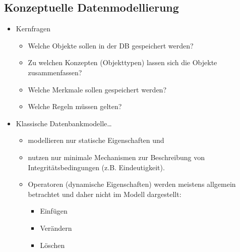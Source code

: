 \documentclass[a4paper, 11pt, accentcolor = tud3b]{tudreport}
\begin{document}
            \subsection{Konzeptuelle Datenmodellierung} %
                \begin{itemize}
                	\item Kernfragen
                		\begin{itemize}
                			\item Welche Objekte sollen in der DB gespeichert werden?
                			\item Zu welchen Konzepten (Objekttypen) lassen sich die Objekte zusammenfassen?
                			\item Welche Merkmale sollen gespeichert werden?
                			\item Welche Regeln müssen gelten?
                		\end{itemize}
                	\item Klassische Datenbankmodelle\dots
                		\begin{itemize}
                			\item modellieren nur statische Eigenschaften und
                			\item nutzen nur minimale Mechanismen zur Beschreibung von Integritätsbedingungen (z.B. Eindeutigkeit).
                			\item Operatoren (dynamische Eigenschaften) werden meistens allgemein betrachtet und daher nicht im Modell dargestellt:
                				\begin{itemize}
                					\item Einfügen
                					\item Verändern
                					\item Löschen
                				\end{itemize}
                		\end{itemize}
                \end{itemize}
\end{document}
